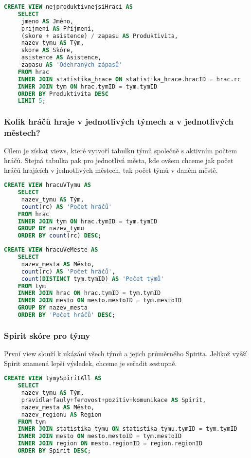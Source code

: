 \documentclass[11pt,oneside,american,czech]{book}
\begin{document}
\begin{lstlisting}[language=SQL]
	CREATE VIEW nejproduktivnejsiHraci AS
	SELECT
	 jmeno AS Jméno,
	 prijmeni AS Příjmení,
	 (skore + asistence) / zapasu AS Produktivita,
	 nazev_tymu AS Tým,
	 skore AS Skóre,
	 asistence AS Asistence,
	 zapasu AS 'Odehraných zápasů'
	FROM hrac
	INNER JOIN statistika_hrace ON statistika_hrace.hracID = hrac.rc
	INNER JOIN tym ON hrac.tymID = tym.tymID
	ORDER BY Produktivita DESC
	LIMIT 5;
\end{lstlisting}

\subsubsection*{Kolik hráčů hraje v jednotlivých týmech a v jednotlivých městech?}

Cílem je získat views, které vytvoří tabulku týmů společně s aktivním počtem hráčů. Stejná tabulka pak pro jednotlivá města, kde ovšem chceme jak počet hráčů hrajících v jednotlivých městech, tak počet týmů v daném městě.

\begin{lstlisting}[language=SQL]
	CREATE VIEW hracuVTymu AS
	SELECT
	 nazev_tymu AS Tým,
	 count(rc) AS 'Počet hráčů'
	FROM hrac
	INNER JOIN tym ON hrac.tymID = tym.tymID
	GROUP BY nazev_tymu
	ORDER BY count(rc) DESC;
\end{lstlisting}

\begin{lstlisting}[language=SQL]
	CREATE VIEW hracuVeMeste AS
	SELECT
	 nazev_mesta AS Město,
	 count(rc) AS 'Počet hráčů',
	 count(DISTINCT tym.tymID) AS 'Počet týmů'
	FROM tym
	INNER JOIN hrac ON hrac.tymID = tym.tymID
	INNER JOIN mesto ON mesto.mestoID = tym.mestoID
	GROUP BY nazev_mesta
	ORDER BY 'Počet hráčů' DESC;
\end{lstlisting}

\pagebreak
\subsubsection*{Spirit skóre pro týmy}

První view slouží k ukázání všech týmů a jejich průměrného Spirita. Jelikož vyšší Spirit znamená lepší výsledek, chceme je seřadit sestupně.

\begin{lstlisting}[language=SQL]
	CREATE VIEW tymySpiritAll AS
	SELECT
	 nazev_tymu AS Tým,
	 pravidla+fauly+ferovost+pozitiv+komunikace AS Spirit,
	 nazev_mesta AS Město,
	 nazev_regionu AS Region
	FROM tym
	INNER JOIN statistika_tymu ON statistika_tymu.tymID = tym.tymID
	INNER JOIN mesto ON mesto.mestoID = tym.mestoID
	INNER JOIN region ON mesto.regionID = region.regionID
	ORDER BY Spirit DESC;
\end{lstlisting}
\end{document}
